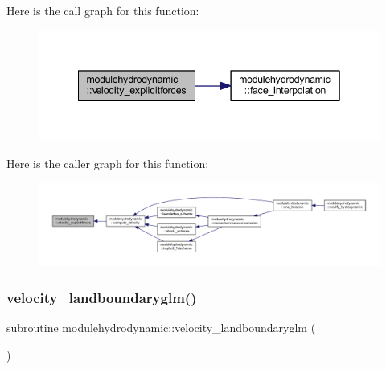 Here is the call graph for this function\+:\nopagebreak
\begin{figure}[H]
\begin{center}
\leavevmode
\includegraphics[width=342pt]{namespacemodulehydrodynamic_a2789c8c5f9e3e6838c5dda5c13dcd234_cgraph}
\end{center}
\end{figure}
Here is the caller graph for this function\+:\nopagebreak
\begin{figure}[H]
\begin{center}
\leavevmode
\includegraphics[width=350pt]{namespacemodulehydrodynamic_a2789c8c5f9e3e6838c5dda5c13dcd234_icgraph}
\end{center}
\end{figure}
\mbox{\label{namespacemodulehydrodynamic_a678adb3cd056a0f44a4c7ba6b7ba8544}} 
\subsubsection{\texorpdfstring{velocity\+\_\+landboundaryglm()}{velocity\_landboundaryglm()}}
{\footnotesize\ttfamily subroutine modulehydrodynamic\+::velocity\+\_\+landboundaryglm (\begin{DoxyParamCaption}{ }\end{DoxyParamCaption})\hspace{0.3cm}{\ttfamily [private]}}

